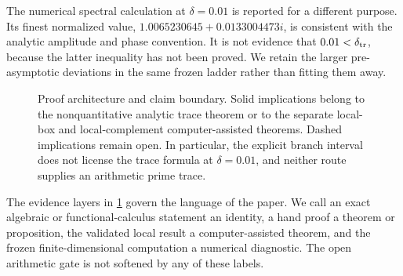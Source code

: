 The numerical spectral calculation at \(\delta=0.01\) is reported for a
different purpose.  Its finest normalized value,
\(1.0065230645+0.0133004473i\), is consistent with the analytic amplitude
and phase convention.  It is not evidence that
\(0.01<\delta_{\rm tr}\), because the latter inequality has not been
proved.  We retain the larger pre-asymptotic deviations in the same frozen
ladder rather than fitting them away.

\begin{figure}[t]
\centering
\setlength{\fboxsep}{7pt}
\begin{minipage}{0.96\textwidth}
\centering
{}
\vspace{2mm}

\vspace{2mm}

\vspace{2mm}

\end{minipage}
\caption{Proof architecture and claim boundary.  Solid implications belong
to the nonquantitative analytic trace theorem or to the separate local-box
and local-complement computer-assisted theorems.  Dashed implications remain open.  In
particular, the explicit branch interval does not license the trace formula
at \(\delta=0.01\), and neither route supplies an arithmetic prime trace.}
\label{fig:architecture}
\end{figure}

The evidence layers in \cref{fig:architecture} govern the language of the
paper.  We call an exact algebraic or functional-calculus statement an
identity, a hand proof a theorem or proposition, the validated local result
a computer-assisted theorem, and the frozen finite-dimensional computation
a numerical diagnostic.  The open arithmetic gate is not softened by any of
these labels.

